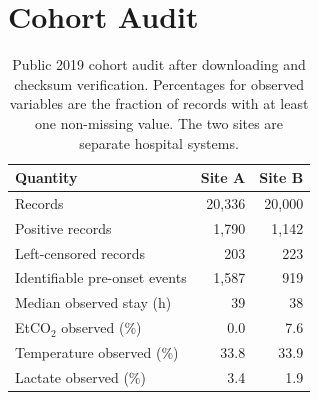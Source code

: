 \section{Cohort Audit}
\label{sec:supp-cohort}

\begin{table}[H]
\centering
\caption{Public 2019 cohort audit after downloading and checksum verification. Percentages for observed variables are the fraction of records with at least one non-missing value. The two sites are separate hospital systems.}
\label{tab:cohort}
\begin{tabular}{lrr}
\toprule
Quantity & Site A & Site B \\
\midrule
Records & 20{,}336 & 20{,}000 \\
Positive records & 1{,}790 & 1{,}142 \\
Left-censored records & 203 & 223 \\
Identifiable pre-onset events & 1{,}587 & 919 \\
Median observed stay (h) & 39 & 38 \\
EtCO$_2$ observed (\%) & 0.0 & 7.6 \\
Temperature observed (\%) & 33.8 & 33.9 \\
Lactate observed (\%) & 3.4 & 1.9 \\
\bottomrule
\end{tabular}
\end{table}
